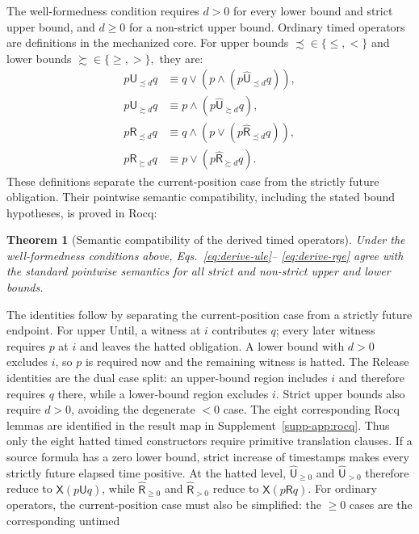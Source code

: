 \documentclass[10pt,journal,compsoc]{IEEEtran}
\newtheorem{theorem}{Theorem}[section]
\newcommand{\Until}{\mathbin{\mathsf{U}}}
\newcommand{\Release}{\mathbin{\mathsf{R}}}
\newcommand{\hUntil}{\mathbin{\widehat{\mathsf{U}}}}
\newcommand{\hRelease}{\mathbin{\widehat{\mathsf{R}}}}
\newcommand{\Next}{\mathsf{X}}
\begin{document}
The well-formedness condition requires $d>0$ for every lower bound and strict
upper bound, and $d\ge0$ for a non-strict upper bound. Ordinary timed
operators are definitions in the mechanized core. For upper bounds
$\precsim\in\{\le,<\}$ and lower bounds $\succsim\in\{\ge,>\},$ they are:
\begin{align}
p\Until_{\precsim d}q &\equiv q\lor(p\land(p\hUntil_{\precsim d}q)),\label{eq:derive-ule}\\
p\Until_{\succsim d}q &\equiv p\land(p\hUntil_{\succsim d}q),\label{eq:derive-uge}\\
p\Release_{\precsim d}q &\equiv q\land(p\lor(p\hRelease_{\precsim d}q)),\label{eq:derive-rle}\\
p\Release_{\succsim d}q &\equiv p\lor(p\hRelease_{\succsim d}q).\label{eq:derive-rge}
\end{align}
These definitions separate the current-position case from the strictly future
obligation. Their pointwise semantic compatibility, including the stated
bound hypotheses, is proved in Rocq:
\begin{theorem}[Semantic compatibility of the derived timed operators]
\label{thm:derived-semantic-compatibility}
Under the well-formedness conditions above, Eqs.~\eqref{eq:derive-ule}--
\eqref{eq:derive-rge} agree with the standard pointwise semantics for all
strict and non-strict upper and lower bounds.
\end{theorem}
The identities follow by separating the current-position case from a
strictly future endpoint. For upper Until, a witness at $i$ contributes
$q$; every later witness requires $p$ at $i$ and leaves the hatted
obligation. A lower bound with $d>0$ excludes $i$, so $p$ is required now
and the remaining witness is hatted. The Release identities are the dual
case split: an upper-bound region includes $i$ and therefore requires $q$
there, while a lower-bound region excludes $i$. Strict upper bounds also
require $d>0$, avoiding the degenerate $<0$ case. The eight corresponding
Rocq lemmas are identified in the result map in Supplement~\ref{supp-app:rocq}.
Thus only
the eight hatted timed constructors require primitive translation clauses.
If a source formula has a zero lower bound, strict increase of timestamps
makes every strictly future elapsed time positive. At the hatted level,
$\hUntil_{\ge0}$ and $\hUntil_{>0}$ therefore reduce to
$\Next(p\Until q)$, while $\hRelease_{\ge0}$ and $\hRelease_{>0}$
reduce to $\Next(p\Release q)$. For ordinary operators, the current-position
case must also be simplified: the $\ge0$ cases are the corresponding untimed
\end{document}

